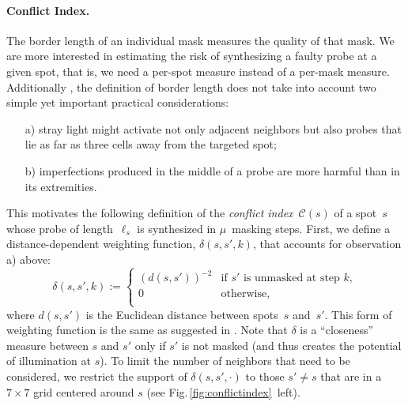 \documentclass{llncs}
\begin{document}
\paragraph{Conflict Index.}
The border length of an individual mask measures the quality of that
mask. We are more interested in estimating the risk of synthesizing a faulty
probe at a given spot, that is, we need a per-spot measure
instead of a per-mask measure. Additionally \cite{KAHNG03A},
the definition of border length does not take into account two
simple yet important practical considerations:
\begin{itemize}
\item[a)] stray light might activate not only adjacent neighbors but
  also probes that lie as far as three cells away from the targeted
  spot;
\item[b)] imperfections produced in the middle of a probe are more
  harmful than in its extremities.
\end{itemize}
This motivates the following definition of the \emph{conflict
  index}~$\mathcal{C}(s)$ of a spot~$s$ whose probe of
length~$\ell_{s}$ is synthesized in $\mu$~masking steps. First, we
define a distance-dependent weighting function, $\delta(s,s',k)$, that
accounts for observation a) above:
\begin{equation}
\label{eq:dist_weight}
\delta(s,s',k) :=
        \left\{
                \begin{array}{ll}
                        (d(s,s'))^{-2} & \mbox{if $s'$ is unmasked at step $k$}, \\
                        0 & \mbox{otherwise}, \\
                \end{array}
        \right.
\end{equation}
where $d(s,s')$ is the Euclidean distance between spots~$s$ and~$s'$.
This form of weighting function is the same as suggested in
\cite{KAHNG03A}.  Note that $\delta$ is a ``closeness'' measure
between $s$ and $s'$ only if $s'$ is
not masked (and thus creates the potential of illumination at $s$). To
limit the number of neighbors that need to be considered, we
restrict the support of $\delta(s,s',\cdot)$ to those $s'\neq s$ that
are in a $7\times 7$ grid centered around $s$ (see
Fig.\,\ref{fig:conflictindex}~left).
\end{document}
